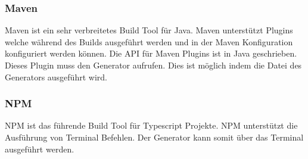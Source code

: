 \documentclass[./einleitung.tex]{subfiles}
\begin{document}
\subsubsection{Maven}
Maven ist ein sehr verbreitetes Build Tool für Java. Maven unterstützt Plugins welche während des Builds ausgeführt werden und in der Maven Konfiguration konfiguriert werden können.
Die API für Maven Plugins ist in Java geschrieben. Dieses Plugin muss den Generator aufrufen. Dies ist möglich indem die Datei des Generators ausgeführt wird.

\subsubsection{NPM}
NPM ist das führende Build Tool für Typescript Projekte. NPM unterstützt die Ausführung von Terminal Befehlen. Der Generator kann somit über das Terminal ausgeführt werden. 

\end{document}
